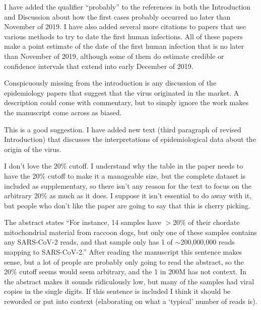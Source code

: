 \documentclass[11pt, oneside]{article}   	%
\newcommand{\response}[1]{{\color{black}#1}}
\begin{document}
\response{
I have added the qualifier ``probably'' to the references in both the Introduction and Discussion about how the first cases probably occurred no later than November of 2019.
I have also added several more citations to papers that use various methods to try to date the first human infections.
All of these papers make a point estimate of the date of the first human infection that is no later than November of 2019, although some of them do estimate credible or confidence intervals that extend into early December of 2019.
}

Conspicuously missing from the introduction is any discussion of the epidemiology papers that suggest that the virus originated in the market.  A description could come with commentary, but to simply ignore the work makes the manuscript come across as biased.

\response{
This is a good suggestion.
I have added new text (third paragraph of revised Introduction) that discusses the interpretations of epidemiological data about the origin of the virus.
}

I don’t love the 20\% cutoff.  I understand why the table in the paper needs to have the 20\% cutoff to make it a manageable size, but the complete dataset is included as supplementary, so there isn’t any reason for the text to focus on the arbitrary 20\% as much as it does.  I suppose it isn’t essential to do away with it, but people who don’t like the paper are going to say that this is cherry picking.

The abstract states ``For instance, 14 samples have $>$20\% of their chordate mitochondrial material from raccoon dogs, but only one of these samples contains any SARS-CoV-2 reads, and that sample only has 1 of $\sim$200,000,000 reads mapping to SARS-CoV-2.''  After reading the manuscript this sentence makes sense, but a lot of people are probably only going to read the abstract, so the 20\% cutoff seems would seem arbitrary, and the 1 in 200M has not context.  In the abstract makes it sounds ridiculously low, but many of the samples had viral copies in the single digits.  If this sentence is included I think it should be reworded or put into context (elaborating on what a `typical' number of reads is).
\end{document}
